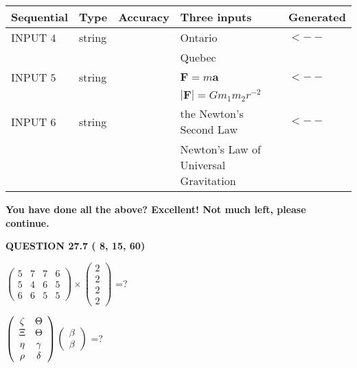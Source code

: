 \documentclass[12pt]{article}
\begin{document}
  
\noindent\begin{tabular}{|l|l|l|l|l|}
\hline
 Sequential & Type & Accuracy & Three inputs & Generated \\ 
\hline
 
 
  INPUT $           4$ & string & & 
 Ontario & 
  $ <-- $ 
  \\
  & & & 
 Quebec & 
 \\  \hline  
 
 
  INPUT $           5$ & string & & 
 $\mathbf{F}=m\mathbf{a}$ & 
  $ <-- $ 
  \\
  & & & 
 $\left| \mathbf{F}\right| =Gm_1m_2r^{-2}$ & 
 \\  \hline  
 
 
  INPUT $           6$ & string & & 
 the Newton's Second Law & 
  $ <-- $ 
  \\
  & & & 
 Newton's Law of Universal Gravitation & 
 \\  \hline  
 \end{tabular}
   
   
   
   
\vspace{0.3in}
{\textbf{\LARGE{You have done all the above? Excellent! Not much left, please continue.}}}
\vspace{0.3in}
   
   
  
\vspace{0.2in}
  
{\textbf{\Large{QUESTION
27.7 
 (          8,         15,         60)
}}}
  
  
 
$ \left( \begin{array}{ccccccccc}
           5 & 
           7 & 
           7 & 
           6 \\ 
           5 & 
           4 & 
           6 & 
           5 \\ 
           6 & 
           6 & 
           5 & 
           5
\end{array}\right) \times
\left( \begin{array}{c}
           2 \\ 
           2 \\ 
           2 \\ 
           2
\end{array}\right) $ =?
 
 
$  %
 \left( \begin{array}
 {
 c
 c
 }
                    \zeta & 
 \Theta \\ 
                    \Xi & 
 \Theta \\ 
 \eta & 
 \gamma \\ 
 \rho & 
 \delta
 \end{array} \right)
 \left( \begin{array}
 {
 c
 }
 \beta \\ 
 \beta
 \end{array} \right)
$ =?
 
\end{document}

